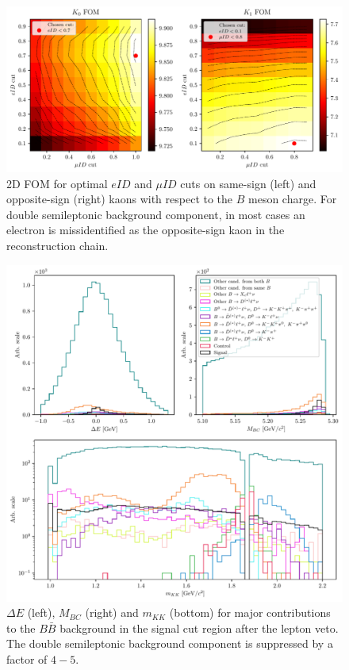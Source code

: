 \begin{figure}[H]
	\centering
	\captionsetup{width=0.8\linewidth}
	\includegraphics[width=\linewidth]{fig/lepVeto}
	\caption{2D FOM for optimal $eID$ and $\mu ID$ cuts on same-sign (left) and opposite-sign (right) kaons with respect to the $B$ meson charge. For double semileptonic background component, in most cases an electron is missidentified as the opposite-sign kaon in the reconstruction chain.}
	\label{fig:lepVeto}
\end{figure} 

\begin{figure}[H]
	\centering
	\captionsetup{width=0.8\linewidth}
	\includegraphics[width=\linewidth]{fig/sig_BKG_composition_all_after}
	\caption{$\Delta E$ (left), $M_{BC}$ (right) and $m_{KK}$ (bottom) for major contributions to the $B \bar B$ background in the signal cut region after the lepton veto. The double semileptonic background component is suppressed by a factor of $4-5$.}
	\label{fig:sig_bkg_all_after}
\end{figure} 

